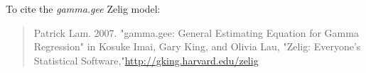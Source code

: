 To cite the \emph{ gamma.gee } Zelig model:
 \begin{verse}
 Patrick Lam. 2007. "gamma.gee: General Estimating Equation for Gamma Regression" in Kosuke Imai, Gary King, and Olivia Lau, "Zelig: Everyone's Statistical Software,"\url{http://gking.harvard.edu/zelig} 
\end{verse}